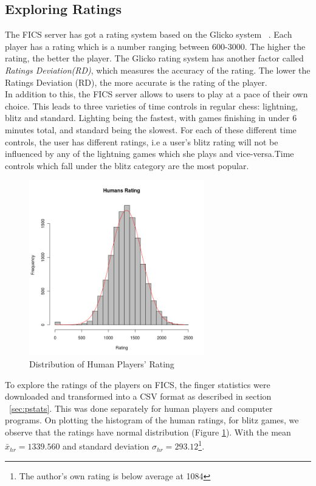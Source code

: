 \documentclass{article}
\begin{document}
\subsection{Exploring Ratings}
The FICS server has got a rating system based on the Glicko system ~\cite{spec:glicko}. Each player has a rating which is a number ranging between 600-3000. The higher the rating, the better the player. The Glicko rating system has another factor called \textsl{Ratings Deviation(RD)}, which measures the accuracy of the rating. The lower the Ratings Deviation (RD), the more accurate is the rating of the player.\\

In addition to this, the FICS server allows to users to play at a pace of their own choice. This leads to three varieties of time controls in regular chess: lightning, blitz and standard. Lighting being the fastest, with games finishing in under 6 minutes total, and standard being the slowest. For each of these different time controls, the user has different ratings, i.e a user's blitz rating will not be influenced by any of the lightning games which she plays and vice-versa.Time controls which fall under the blitz category are the most popular.\\

\begin{figure} [htp]
\begin{center}
\includegraphics[width=3in]{humans_rating.png}
\end{center}
\caption{Distribution of Human Players' Rating}
\label{fig:humanrating}
\end{figure}


To explore the ratings of the players on FICS, the finger statistics were downloaded and transformed into a CSV format as described in section ~\ref{sec:pstats}. This was done separately for human players and computer programs. On plotting the histogram of the human ratings, for blitz games, we observe that the ratings have normal distribution (Figure \ref{fig:humanrating}). With the mean $\bar{x}_{hr} = 1339.560$ and standard deviation $\sigma_{hr} = 293.12$\footnote{The author's own rating is below average at 1084}.\\
\end{document}
